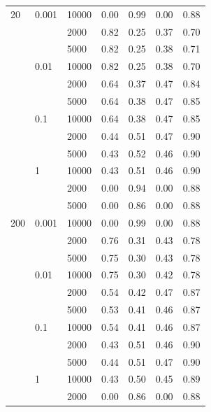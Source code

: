 \documentclass[a4paper,10pt]{article}
\begin{document}
\begin{table}[!ht]
\begin{multicols}{2}
\begin{scriptsize}
\begin{tabular}{|lllrrrr|}
20 & 0.001 & 10000 &       0.00 &       0.99 &       0.00 &       0.88 \\
      &       & 2000 &       0.82 &       0.25 &       0.37 &       0.70 \\
      &       & 5000 &       0.82 &       0.25 &       0.38 &       0.71 \\
      & 0.01 & 10000 &       0.82 &       0.25 &       0.38 &       0.70 \\
      &       & 2000 &       0.64 &       0.37 &       0.47 &       0.84 \\
      &       & 5000 &       0.64 &       0.38 &       0.47 &       0.85 \\
      & 0.1 & 10000 &       0.64 &       0.38 &       0.47 &       0.85 \\
      &       & 2000 &       0.44 &       0.51 &       0.47 &       0.90 \\
      &       & 5000 &       0.43 &       0.52 &       0.46 &       0.90 \\
      & 1 & 10000 &       0.43 &       0.51 &       0.46 &       0.90 \\
      &       & 2000 &       0.00 &       0.94 &       0.00 &       0.88 \\
      &       & 5000 &       0.00 &       0.86 &       0.00 &       0.88 \\
200 & 0.001 & 10000 &       0.00 &       0.99 &       0.00 &       0.88 \\
      &       & 2000 &       0.76 &       0.31 &       0.43 &       0.78 \\
      &       & 5000 &       0.75 &       0.30 &       0.43 &       0.78 \\
      & 0.01 & 10000 &       0.75 &       0.30 &       0.42 &       0.78 \\
      &       & 2000 &       0.54 &       0.42 &       0.47 &       0.87 \\
      &       & 5000 &       0.53 &       0.41 &       0.46 &       0.87 \\
      & 0.1 & 10000 &       0.54 &       0.41 &       0.46 &       0.87 \\
      &       & 2000 &       0.43 &       0.51 &       0.46 &       0.90 \\
      &       & 5000 &       0.44 &       0.51 &       0.47 &       0.90 \\
      & 1 & 10000 &       0.43 &       0.50 &       0.45 &       0.89 \\
      &       & 2000 &       0.00 &       0.86 &       0.00 &       0.88 \\

\end{tabular}
\end{scriptsize}
\end{multicols}
\end{table}
\end{document}
